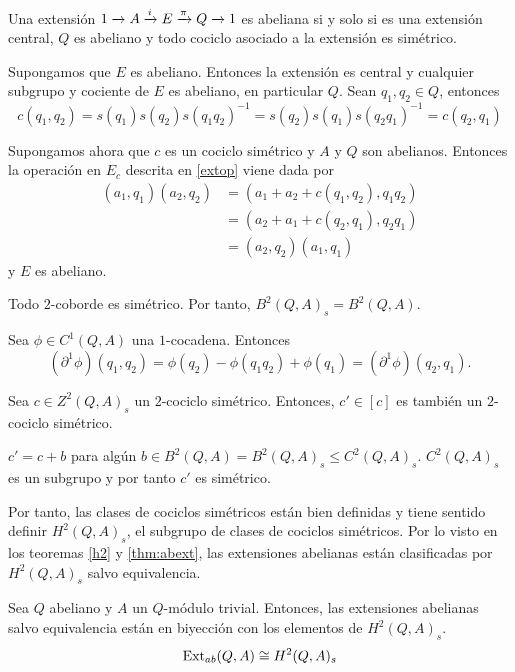 \begin{teorema}\label{thm:abext}
	Una extensión $\extension i \pi A E Q$ es abeliana si y solo si es una extensión central, $Q$ es abeliano y todo cociclo asociado a la extensión es simétrico.
	\begin{demostracion}
		Supongamos que $E$ es abeliano. Entonces la extensión es central y cualquier subgrupo y cociente de $E$ es abeliano, en particular $Q$. Sean $q_1,q_2\in Q$, entonces
		\begin{equation*}
			c(q_1,q_2)=s(q_1)s(q_2)s(q_1q_2)^{-1} = s(q_2)s(q_1)s(q_2q_1)^{-1} = c(q_2,q_1)
		\end{equation*}
		
		Supongamos ahora que $c$ es un cociclo simétrico y $A$ y $Q$ son abelianos. Entonces la operación en $E_c$ descrita en \ref{extop} viene dada por 
		\begin{align*}
			(a_1,q_1)(a_2,q_2) 
			& = (a_1+a_2 + c(q_1,q_2),q_1q_2) \\
			& = (a_2+a_1 + c(q_2,q_1),q_2q_1) \\
			& = (a_2,q_2)(a_1,q_1)
		\end{align*}
		y $E$ es abeliano.
	\end{demostracion}
\end{teorema}

\begin{proposicion}
		Todo $2$-coborde es simétrico. Por tanto, $B^2(Q,A)_s=B^2(Q,A)$.
	\begin{demostracion}
		Sea $\phi\in C^1(Q,A)$ una $1$-cocadena. Entonces
		\begin{equation*}
			(\partial^1\phi)(q_1,q_2) = \phi(q_2) - \phi(q_1q_2) + \phi(q_1) = (\partial^1\phi)(q_2,q_1).
		\end{equation*}
	\end{demostracion}
\end{proposicion}

\begin{corolario}
	Sea $c\in Z^2(Q,A)_s$ un $2$-cociclo simétrico. Entonces, $c'\in [c]$ es también un $2$-cociclo simétrico.
	\begin{demostracion}
		$c' = c+b$ para algún $b\in B^2(Q,A)=B^2(Q,A)_s\leq C^2(Q,A)_s$. $C^2(Q,A)_s$ es un subgrupo y por tanto $c'$ es simétrico.
	\end{demostracion}
\end{corolario}

Por tanto, las clases de cociclos simétricos están bien definidas y tiene sentido definir $H^2(Q,A)_s$, el subgrupo de clases de cociclos simétricos. Por lo visto en los teoremas \ref{h2} y \ref{thm:abext}, las extensiones abelianas están clasificadas por $H^2(Q,A)_s$ salvo equivalencia.

\begin{teorema}
	Sea $Q$ abeliano y $A$ un $Q$-módulo trivial. Entonces, las extensiones abelianas salvo equivalencia están en biyección con los elementos de $H^2(Q,A)_s$.
	\begin{equation*}
		\ExtFunctor_{ab}(Q,A) \cong H^2(Q,A)_s
	\end{equation*}
\end{teorema}